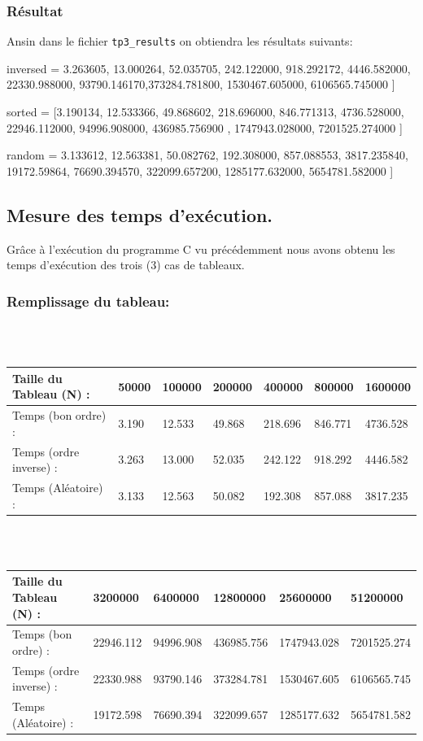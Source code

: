 \documentclass[12pt]{article}
\begin{document}
\subsubsection{Résultat}
Ansin dans le fichier \texttt{tp3\_results} on obtiendra les résultats suivants:
\begin{sql}
inversed = 3.263605, 13.000264, 52.035705, 242.122000, 918.292172, 
 4446.582000, 22330.988000, 93790.146170,373284.781800, 1530467.605000,
  6106565.745000  ]
  
sorted = [3.190134, 12.533366, 49.868602, 218.696000, 846.771313, 
4736.528000, 22946.112000, 94996.908000, 436985.756900 , 1747943.028000,
 7201525.274000 ]
 
random = 3.133612, 12.563381, 50.082762, 192.308000, 857.088553,  
3817.235840, 19172.59864, 76690.394570, 322099.657200, 1285177.632000,
 5654781.582000 ]
\end{sql}

\subsection{Mesure des temps d'exécution.}
Grâce à l'exécution du programme C vu précédemment nous avons obtenu les temps d'exécution des trois (3) cas de tableaux.

\subsubsection{Remplissage du tableau:}
\color{blue}
\textrm{  }
\\
\\
\begin{tabular}{|p{3cm}||p{1.8cm}|p{1.8cm}|p{1.8cm}|p{1.8cm}|p{1.8cm}|p{1.8cm}|}
\hline
Taille du Tableau (N) : & 50000 & 100000 & 200000 & 400000 & 800000  & 1600000\\
\hline
Temps (bon ordre) : & 3.190 & 12.533 & 49.868 & 218.696 & 846.771 & 4736.528 \\
\hline

Temps (ordre inverse) :  & 3.263 & 13.000 & 52.035 & 242.122 & 918.292 & 4446.582 \\
\hline

Temps (Aléatoire) : & 3.133 & 12.563 & 50.082 & 192.308 & 857.088 & 3817.235 \\
\hline
\end{tabular}
\\
\\
\begin{tabular}{|p{3cm}||p{2cm}|p{2cm}|p{2cm}|p{2cm}|p{2cm}|}
\hline
Taille du Tableau (N) : & 3200000 & 6400000 & 12800000 & 25600000 &  51200000  \\
\hline

Temps (bon ordre) : & 22946.112 & 94996.908 & 436985.756 & 1747943.028 & 7201525.274  \\
\hline

Temps (ordre inverse) : &  22330.988 & 93790.146 & 373284.781 & 1530467.605 &  6106565.745  \\
\hline

Temps (Aléatoire) : & 19172.598 & 76690.394 & 322099.657 & 1285177.632 & 5654781.582  \\
\hline
\end{tabular}
\end{document}
